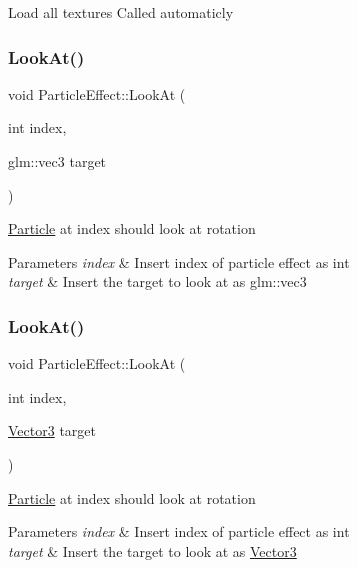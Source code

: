Load all textures Called automaticly \mbox{\label{class_particle_effect_a24f05464826e67aa4f6aec7e518357ec}} 
\subsubsection{\texorpdfstring{LookAt()}{LookAt()}\hspace{0.1cm}{\footnotesize\ttfamily [1/2]}}
{\footnotesize\ttfamily void Particle\+Effect\+::\+Look\+At (\begin{DoxyParamCaption}\item[{int}]{index,  }\item[{glm\+::vec3}]{target }\end{DoxyParamCaption})}

\mbox{\hyperlink{struct_particle}{Particle}} at index should look at rotation 
\begin{DoxyParams}{Parameters}
{\em index} & Insert index of particle effect as int \\
\hline
{\em target} & Insert the target to look at as glm\+::vec3 \\
\hline
\end{DoxyParams}
\mbox{\label{class_particle_effect_a86079b5ebfbcc355f56a38f8ed7e5573}} 
\subsubsection{\texorpdfstring{LookAt()}{LookAt()}\hspace{0.1cm}{\footnotesize\ttfamily [2/2]}}
{\footnotesize\ttfamily void Particle\+Effect\+::\+Look\+At (\begin{DoxyParamCaption}\item[{int}]{index,  }\item[{\mbox{\hyperlink{struct_vector3}{Vector3}}}]{target }\end{DoxyParamCaption})}

\mbox{\hyperlink{struct_particle}{Particle}} at index should look at rotation 
\begin{DoxyParams}{Parameters}
{\em index} & Insert index of particle effect as int \\
\hline
{\em target} & Insert the target to look at as \mbox{\hyperlink{struct_vector3}{Vector3}} \\
\hline
\end{DoxyParams}
\mbox{\label{class_particle_effect_a416fd6e7ea5e69dbb5bd77f8a9487c82}} 
